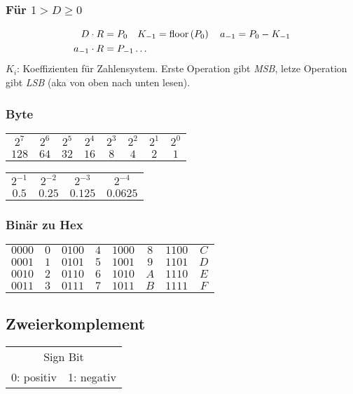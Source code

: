 \subsubsection{Für $1 > D \geq 0$}
\begin{align*}
    D \cdot R &= P_0 \quad K_{-1} = \text{floor}\left(P_0\right) \quad a_{-1} = P_0 - K_{-1}\\ 
    a_{-1} \cdot R &= P_{-1} \dots
\end{align*}
$K_i$: Koeffizienten für Zahlensystem. Erste Operation gibt \emph{MSB}, letze Operation gibt \emph{LSB} (aka von oben nach unten lesen).

\subsubsection{Byte}
\begin{center}
    \begin{tabular}{c|c|c|c|c|c|c|c}
        $2^7$ & $2^6$ & $2^5$ & $2^4$ & $2^3$ & $2^2$ & $2^1$ & $2^0$\\
        $128$ & $64$ & $32$ & $16$ & $8$ & $4$ & $2$ & $1$
    \end{tabular}
\end{center}
\begin{center}
    \begin{tabular}{c|c|c|c}
        $2^{-1}$ & $2^{-2}$ & $2^{-3}$ & $2^{-4}$\\
        $0.5$ & $0.25$ & $0.125$ & $0.0625$
    \end{tabular}
\end{center}

\subsubsection{Binär zu Hex}
\begin{center}
    \begin{tabular}{c c||c c||c c||c c}
        $0000$ & $0$ & $0100$ & $4$ & $1000$ & $8$ & $1100$ & $C$\\
        $0001$ & $1$ & $0101$ & $5$ & $1001$ & $9$ & $1101$ & $D$\\
        $0010$ & $2$ & $0110$ & $6$ & $1010$ & $A$ & $1110$ & $E$\\
        $0011$ & $3$ & $0111$ & $7$ & $1011$ & $B$ & $1111$ & $F$\\
    \end{tabular}
\end{center}
\subsection{Zweierkomplement}
\begin{center}
    \begin{tabular}{c c}
        \multicolumn{2}{c}{Sign Bit}\\
        0: positiv & 1: negativ
    \end{tabular}
\end{center}

